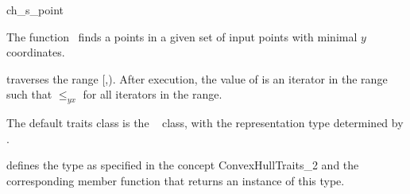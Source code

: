 

\begin{ccRefFunction}{ch_s_point}  %

\ccDefinition
  
The function \ccRefName\ finds a points in a given set  
of input points with minimal $y$ coordinates.


           {traverses the range [,).
            After execution, the value of
             is an iterator in the range such that  $\le_{yx}$
             for all iterators  in the range.}


The default traits class  is the \cgal\ 
 class,
with the representation type determined by .

 defines the type  as specified in
the concept ConvexHullTraits\_2 and the corresponding member
function that returns an instance of this type.


\ccSeeAlso

 \\
 \\
 \\
 \\
 \\

\end{ccRefFunction}


